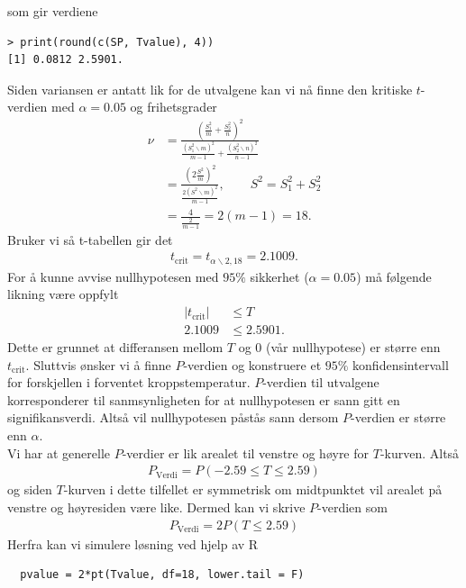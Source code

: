 \documentclass[12pt,
               a4paper,
               article,
               oneside,
               oldfontcommands,
               norsk]{memoir}
\begin{document}
som gir verdiene 
\begin{verbatim}
> print(round(c(SP, Tvalue), 4))
[1] 0.0812 2.5901.
\end{verbatim}
Siden variansen er antatt lik for de utvalgene kan vi nå finne den kritiske $t$-verdien med $\alpha = 0.05$ og frihetsgrader 
\begin{align*}
 \nu &= \frac{\left(\frac{S_{1}^{2}}{m} + \frac{S_{2}^2}{n} \right)^2}{\frac{\left(S_{1}^2 \backslash m \right)^2}{m-1} + {\frac{\left(S_{2}^2 \backslash n \right)^2}{n-1}}} \\[7pt] 
 &= \frac{\left(2 \frac{S^2}{m} \right)^2}{\frac{2\left( S^2 \backslash m \right)^2}{m-1}}, \qquad \boxed{S^{2} = S_{1}^2 + S_{2}^2} \\[7pt] 
 &= \frac{4}{\frac{2}{m-1}} = 2(m-1) = 18.
\end{align*}
Bruker vi så t-tabellen gir det 
\begin{align*}
  t_{\text{crit}} = t_{\alpha \backslash 2, 18} = 2.1009.
\end{align*}
For å kunne avvise nullhypotesen med $95 \%$ sikkerhet ($\alpha = 0.05$) må følgende likning være oppfylt 
\begin{align*}
  |t_{\text{crit}}| &\leq T \\[5pt] 
  2.1009 &\leq 2.5901.
\end{align*}
Dette er grunnet at differansen mellom $T$ og $0$ (vår nullhypotese) er større enn $t_{\text{crit}}$. Sluttvis ønsker vi å finne $P$-verdien og konstruere et $95 \%$ konfidensintervall for forskjellen i forventet kroppstemperatur. $P$-verdien til utvalgene korresponderer til sanmsynligheten for at nullhypotesen er sann gitt en signifikansverdi. Altså vil nullhypotesen påstås sann dersom $P$-verdien er større enn $\alpha$. \vspace{2mm}\\
Vi har at generelle $P$-verdier er lik arealet til venstre og høyre for $T$-kurven. Altså 
\begin{align*}
  P_{\text{Verdi}} = P(-2.59 \leq T \leq 2.59)
\end{align*}
og siden $T$-kurven i dette tilfellet er symmetrisk om midtpunktet vil arealet på venstre og høyresiden være like. Dermed kan vi skrive $P$-verdien som 
\begin{align*}
  P_{\text{Verdi}} = 2P(T \leq 2.59)
\end{align*}
Herfra kan vi simulere løsning ved hjelp av R 
\begin{lstlisting}
  pvalue = 2*pt(Tvalue, df=18, lower.tail = F)
\end{lstlisting}
\end{document}
